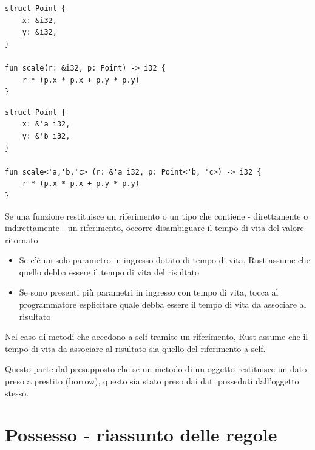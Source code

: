 \begin{center}
  \centering
  \begin{minipage}{\linewidth}
    \begin{minipage}{0.50\linewidth}
      \begin{verbatim}
struct Point {
    x: &i32,
    y: &i32,
}

fun scale(r: &i32, p: Point) -> i32 {
    r * (p.x * p.x + p.y * p.y)
}       
\end{verbatim}
    \end{minipage}%
    \hfill %
    \begin{minipage}{0.50\linewidth}
      \begin{verbatim}
struct Point {
    x: &'a i32,
    y: &'b i32,
}

fun scale<'a,'b,'c> (r: &'a i32, p: Point<'b, 'c>) -> i32 {
    r * (p.x * p.x + p.y * p.y)
}   
\end{verbatim}
    \end{minipage}
  \end{minipage}
\end{center}

Se una funzione restituisce un riferimento o un tipo che contiene - direttamente o
indirettamente - un riferimento, occorre disambiguare il tempo di vita del valore
ritornato

\begin{itemize}
  \item Se c'è un solo parametro in ingresso dotato di tempo di vita, Rust assume che quello debba essere il tempo di vita del risultato
  \item Se sono presenti più parametri in ingresso con tempo di vita, tocca al programmatore esplicitare quale debba essere il tempo di vita da associare al risultato
\end{itemize}

Nel caso di metodi che accedono a self tramite un riferimento, Rust assume che il
tempo di vita da associare al risultato sia quello del riferimento a self.

Questo parte dal presupposto che se un metodo di un oggetto restituisce un dato preso a prestito
(borrow), questo sia stato preso dai dati posseduti dall'oggetto stesso.


\section{Possesso - riassunto delle regole}

